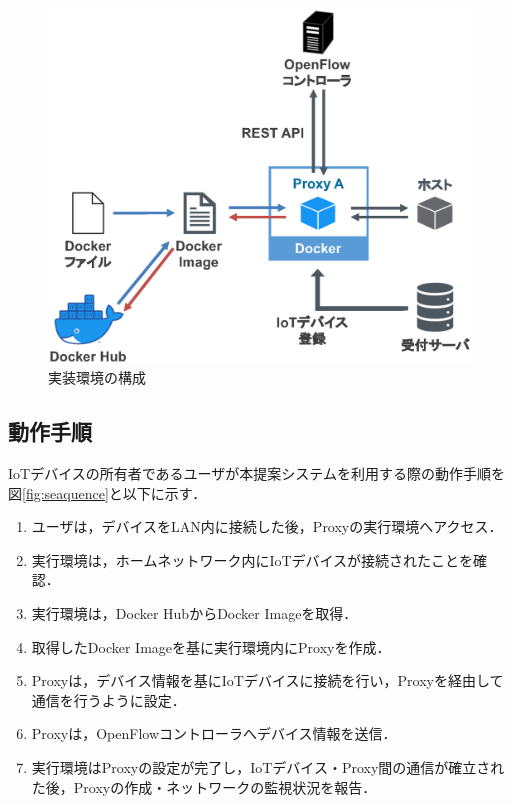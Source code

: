 \documentclass[Japanese]{dicomopapers}
\begin{document}
\begin{figure}[!tb]
	\centering
	\includegraphics[width=\linewidth]{img/program.eps}
	\caption{実装環境の構成}
	\label{fig:program}
\end{figure}

\subsection{動作手順}
IoTデバイスの所有者であるユーザが本提案システムを利用する際の動作手順を図\ref{fig:seaquence}と以下に示す．
\begin{enumerate}
	\item ユーザは，デバイスをLAN内に接続した後，Proxyの実行環境へアクセス．
	\item 実行環境は，ホームネットワーク内にIoTデバイスが接続されたことを確認．
	\item 実行環境は，Docker HubからDocker Imageを取得．
	\item 取得したDocker Imageを基に実行環境内にProxyを作成．
	\item Proxyは，デバイス情報を基にIoTデバイスに接続を行い，Proxyを経由して通信を行うように設定．
	\item Proxyは，OpenFlowコントローラへデバイス情報を送信．
	\item 実行環境はProxyの設定が完了し，IoTデバイス・Proxy間の通信が確立された後，Proxyの作成・ネットワークの監視状況を報告．
\end{enumerate}
\end{document}
